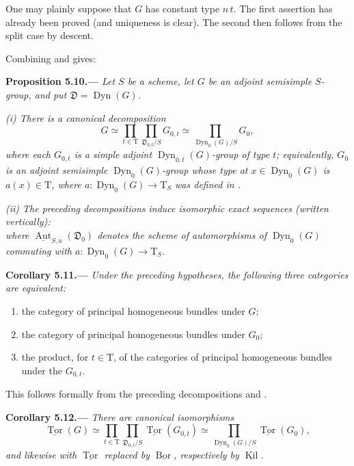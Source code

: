 One may plainly suppose that \(G\) has constant type \(n\,t\).  The
first assertion has already been proved (and uniqueness is clear).
The second then follows from the split case by descent.

Combining  and  gives:

\par\medskip\noindent{}\textbf{Proposition 5.10.---}\enspace
\emph{Let \(S\) be a scheme, let \(G\) be an adjoint semisimple
\(S\)-group, and put \(\mathfrak D=\operatorname{Dyn}(G)\).}

\emph{(i) There is a canonical decomposition}
\[
  G\simeq
  \prod_{t\in\mathrm T}
  \prod_{\mathfrak D_{0,t}/S}G_{0,t}
  \simeq
  \prod_{\operatorname{Dyn}_0(G)/S}G_0,
\]
\emph{where each \(G_{0,t}\) is a simple adjoint
\(\operatorname{Dyn}_{0,t}(G)\)-group of type \(t\); equivalently,
\(G_0\) is an adjoint semisimple
\(\operatorname{Dyn}_0(G)\)-group whose type at
\(x\in\operatorname{Dyn}_0(G)\) is \(a(x)\in\mathrm T\), where
\(a:\operatorname{Dyn}_0(G)\to\mathrm T_S\) was defined in .}

\emph{(ii) The preceding decompositions induce isomorphic exact
sequences \textup{(}written vertically\textup{)}:}
\[
  
\]
\emph{where \(\underline{\operatorname{Aut}}_{S,a}(\mathfrak D_0)\) denotes the
scheme of automorphisms of \(\operatorname{Dyn}_0(G)\) commuting with
\(a:\operatorname{Dyn}_0(G)\to\mathrm T_S\).}

\par\medskip\noindent{}\textbf{Corollary 5.11.---}\enspace
\emph{Under the preceding hypotheses, the following three categories
are equivalent:}
\begin{enumerate}
\item[(i)] the category of principal homogeneous bundles under \(G\);
\item[(ii)] the category of principal homogeneous bundles under \(G_0\);
\item[(iii)] the product, for \(t\in\mathrm T\), of the categories of
principal homogeneous bundles under the \(G_{0,t}\).
\end{enumerate}
This follows formally from the preceding decompositions and .

\par\medskip\noindent{}\textbf{Corollary 5.12.---}\enspace
\emph{There are canonical isomorphisms}
\[
  \underline{\operatorname{Tor}}(G)
  \simeq
  \prod_{t\in\mathrm T}
  \prod_{\mathfrak D_{0,t}/S}
    \underline{\operatorname{Tor}}(G_{0,t})
  \simeq
  \prod_{\operatorname{Dyn}_0(G)/S}
    \underline{\operatorname{Tor}}(G_0),
\]
\emph{and likewise with \(\underline{\operatorname{Tor}}\) replaced
by \(\underline{\operatorname{Bor}}\), respectively by
\(\underline{\operatorname{Kil}}\).}

